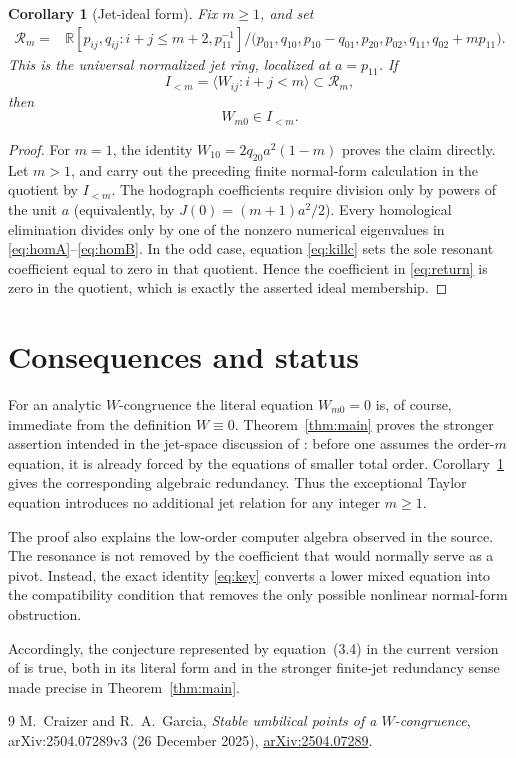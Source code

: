 \documentclass[11pt]{article}
\newtheorem{corollary}[theorem]{Corollary}
\theoremstyle{remark}
\newcommand{\R}{\mathbb R}
\begin{document}
\begin{corollary}[Jet-ideal form]                                  \label{cor:ideal}
Fix \(m\ge1\), and set
\begin{align*}
 \mathcal R_m={}&
 \R[p_{ij},q_{ij}:i+j\le m+2,p_{11}^{-1}]\big/
 \bigl(p_{01},q_{10},p_{10}-q_{01},p_{20},p_{02},q_{11},
       q_{02}+mp_{11}\bigr).
\end{align*}
This is the universal normalized jet ring, localized at
\(a=p_{11}\).  If
\[
             I_{<m}=\langle W_{ij}:i+j<m\rangle\subset\mathcal R_m,
\]
then
\[
                              W_{m0}\in I_{<m}.
\]
\end{corollary}

\begin{proof}
For \(m=1\), the identity \(W_{10}=2q_{20}a^2(1-m)\) proves the claim
directly.  Let \(m>1\), and carry out the preceding finite normal-form
calculation in the quotient by
\(I_{<m}\).  The hodograph coefficients require division only by powers of
the unit \(a\) (equivalently, by \(J(0)=(m+1)a^2/2\)).  Every homological
elimination divides only by one of the nonzero numerical eigenvalues in
\eqref{eq:homA}--\eqref{eq:homB}.  In the odd case, equation
\eqref{eq:killc} sets the sole resonant coefficient equal to zero in that
quotient.  Hence the coefficient in \eqref{eq:return} is zero in the
quotient, which is exactly the asserted ideal membership.
\end{proof}

\section{Consequences and status}

For an analytic \(W\)-congruence the literal equation \(W_{m0}=0\) is, of
course, immediate from the definition \(W\equiv0\).  Theorem~\ref{thm:main}
proves the stronger assertion intended in the jet-space discussion of
\cite{CG}: before one assumes the order-\(m\) equation, it is already forced
by the equations of smaller total order.  Corollary~\ref{cor:ideal} gives
the corresponding algebraic redundancy.  Thus the exceptional Taylor
equation introduces no additional jet relation for any integer \(m\ge1\).

The proof also explains the low-order computer algebra observed in the
source.  The resonance is not removed by the coefficient that would normally
serve as a pivot.  Instead, the exact identity \eqref{eq:key} converts a
lower mixed equation into the compatibility condition that removes the only
possible nonlinear normal-form obstruction.

Accordingly, the conjecture represented by equation~(3.4) in the current
version of \cite{CG} is true, both in its literal form and in the stronger
finite-jet redundancy sense made precise in Theorem~\ref{thm:main}.

\begin{thebibliography}{9}
M.~Craizer and R.~A.~Garcia,
\emph{Stable umbilical points of a \(W\)-congruence},
arXiv:2504.07289v3 (26 December 2025),
\href{https://arxiv.org/abs/2504.07289}{arXiv:2504.07289}.
\end{thebibliography}
\end{document}
